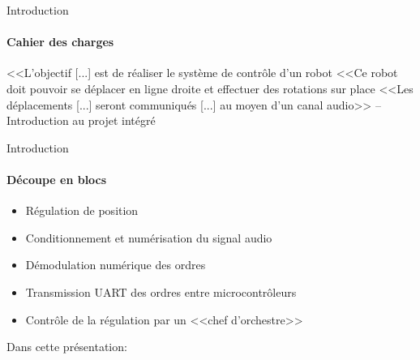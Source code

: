 \begin{frame}{Introduction}
\framesubtitle{Cahier des charges}
\large
<<L'objectif [...] est de réaliser le système de contrôle d'un robot
\vfill
<<Ce robot doit pouvoir se déplacer en ligne droite et effectuer des rotations sur place
\vfill
<<Les déplacements [...] seront communiqués [...] au moyen d'un canal audio>>
\vfill
\hspace{5em}--Introduction au projet intégré
\end{frame}


\begin{frame}{Introduction}
  \framesubtitle{Découpe en blocs}
  \begin{itemize}
    \item Régulation de position
    \item Conditionnement et numérisation du signal audio
    \item Démodulation numérique des ordres
    \item Transmission UART des ordres entre microcontrôleurs
    \item Contrôle de la régulation par un <<chef d'orchestre>>
  \end{itemize}
\end{frame}

\begin{frame}{Dans cette présentation:}
  \tableofcontents
\end{frame}
